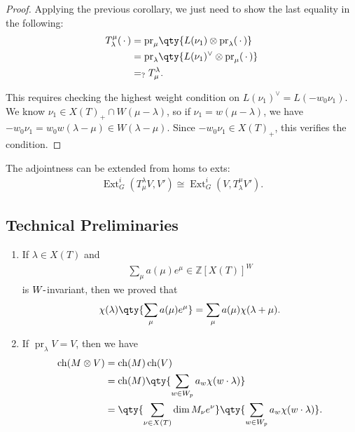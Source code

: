 \begin{proof}

Applying the previous corollary, we just need to show the last equality
in the following:
\begin{align*}  
T_\lambda^\mu({\,\cdot\,}) 
&= {\operatorname{pr}}_\mu \qty{ L(\nu_1) \otimes{\operatorname{pr}}_\lambda({\,\cdot\,}) } \\
&= {\operatorname{pr}}_\lambda \qty{ L(\nu_1)^\vee\otimes{\operatorname{pr}}_\mu({\,\cdot\,}) } \\
&=_? T_\mu^\lambda
.\end{align*}

This requires checking the highest weight condition on
\(L(\nu_1)^\vee= L(-w_0 \nu_1)\). We know
\(\nu_1 \in X(T)_+ \cap W(\mu-\lambda)\), so if
\(\nu_1 = w(\mu-\lambda)\), we have
\(-w_0 \nu_1 = w_0 w (\lambda - \mu) \in W(\lambda - \mu)\). Since
\(-w_0 \nu_1 \in X(T)_+\), this verifies the condition.

\end{proof}

\begin{remark}

The adjointness can be extended from homs to exts:
\begin{align*}  
\operatorname{Ext}_G^i(T_\mu^\lambda V, V' ) \cong \operatorname{Ext}_G^i(V, T_\lambda^\mu V')
.\end{align*}

\end{remark}

\hypertarget{technical-preliminaries}{%
\subsection{Technical Preliminaries}\label{technical-preliminaries}}

\begin{enumerate}
\def\labelenumi{\arabic{enumi}.}
\item
  If \(\lambda \in X(T)\) and
  \begin{align*}  
    \sum_\mu a(\mu) e^\mu \in {\mathbb{Z}}[X(T)]^W
    \end{align*}
  is \(W{\hbox{-}}\)invariant, then we proved that
  \begin{align*}  
    \chi(\lambda)
    \qty{
    \sum_\mu a(\mu) e^{\mu}
    }
    = \sum_\mu a(\mu) \chi(\lambda + \mu)
    .\end{align*}
\item
  If \({\operatorname{pr}}_\lambda V = V\), then we have
  \begin{align*}  
  \operatorname{ch}(M\otimes V) 
  &= \operatorname{ch}(M) \operatorname{ch}(V) \\
  &= \operatorname{ch}(M) \qty{\sum_{w\in W_p} a_w \chi(w\cdot\lambda) } \\
  &= \qty{ \sum_{\nu \in X(T)} \dim M_\nu e^\nu } \qty{\sum_{w\in W_p} a_w \chi(w\cdot\lambda) }
  .\end{align*}
\end{enumerate}

